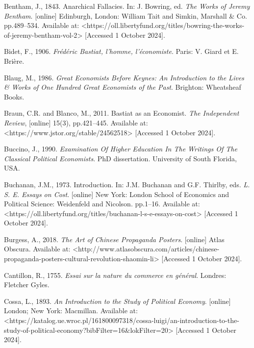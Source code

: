 Bentham, J., 1843. Anarchical Fallacies. In: J. Bowring, ed. \textit{The Works of Jeremy Bentham}. [online] Edinburgh, London: William Tait and Simkin, Marshall \& Co. pp.489–534. Available at: {\textless}https://oll.libertyfund.org/titles/bowring-the-works-of-jeremy-bentham-vol-2{\textgreater} [Accessed 1 October 2024].



Bidet, F., 1906. \textit{Frédéric Bastiat, l'homme, l'économiste}. Paris: V. Giard et E. Brière.



Blaug, M., 1986. \textit{Great Economists Before Keynes: An Introduction to the Lives \& Works of One Hundred Great Economists of the Past}. Brighton: Wheatsheaf Books.



Braun, C.R. and Blanco, M., 2011. Bastiat as an Economist. \textit{The Independent Review}, [online] 15(3), pp.421–445. Available at: {\textless}https://www.jstor.org/stable/24562518{\textgreater} [Accessed 1 October 2024].



Buccino, J., 1990. \textit{Examination Of Higher Education In The Writings Of The Classical Political Economists}. PhD dissertation. University of South Florida, USA.



Buchanan, J.M., 1973. Introduction. In: J.M. Buchanan and G.F. Thirlby, eds. \textit{L. S. E. Essays on Cost}. [online] New York: London School of Economics and Political Science: Weidenfeld and Nicolson. pp.1–16. Available at: {\textless}https://oll.libertyfund.org/titles/buchanan-l-s-e-essays-on-cost{\textgreater} [Accessed 1 October 2024].



Burgess, A., 2018. \textit{The Art of Chinese Propaganda Posters}. [online] Atlas Obscura. Available at: {\textless}http://www.atlasobscura.com/articles/chinese-propaganda-posters-cultural-revolution-shaomin-li{\textgreater} [Accessed 1 October 2024].



Cantillon, R., 1755. \textit{Essai sur la nature du commerce en général}. Londres: Fletcher Gyles.



Cossa, L., 1893. \textit{An Introduction to the Study of Political Economy}. [online] London; New York: Macmillan. Available at: {\textless}https://katalog.ue.wroc.pl/161800097318/cossa-luigi/an-introduction-to-the-study-of-political-economy?bibFilter=16\&lokFilter=20{\textgreater} [Accessed 1 October 2024].



